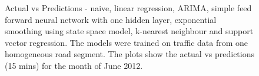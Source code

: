 \begin{figure}[h]
    \qquad

    \caption[Actual vs Predictions, using currently popular methods]{Actual vs Predictions -
    naive, linear regression, ARIMA, simple feed forward neural network with one hidden layer, exponential
    smoothing using state space model, k-nearest neighbour and support vector regression.
    The models were trained on traffic data from one homogeneous road segment. The plots show the
    actual vs predictions (15 mins) for the month of June 2012.}
    \label{fig:comparedModels}
\end{figure}


